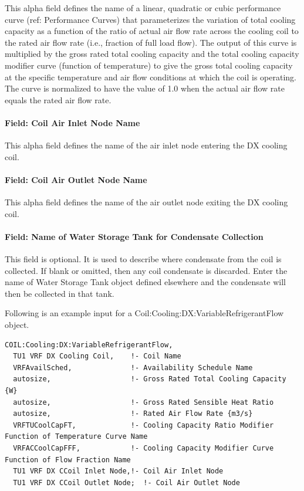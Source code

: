 This alpha field defines the name of a linear, quadratic or cubic performance curve (ref: Performance Curves) that parameterizes the variation of total cooling capacity as a function of the ratio of actual air flow rate across the cooling coil to the rated air flow rate (i.e., fraction of full load flow). The output of this curve is multiplied by the gross rated total cooling capacity and the total cooling capacity modifier curve (function of temperature) to give the gross total cooling capacity at the specific temperature and air flow conditions at which the coil is operating. The curve is normalized to have the value of 1.0 when the actual air flow rate equals the rated air flow rate.

\paragraph{Field: Coil Air Inlet Node Name}\label{field-coil-air-inlet-node-name}

This alpha field defines the name of the air inlet node entering the DX cooling coil.

\paragraph{Field: Coil Air Outlet Node Name}\label{field-coil-air-outlet-node-name}

This alpha field defines the name of the air outlet node exiting the DX cooling coil.

\paragraph{Field: Name of Water Storage Tank for Condensate Collection}\label{field-name-of-water-storage-tank-for-condensate-collection}

This field is optional. It is used to describe where condensate from the coil is collected. If blank or omitted, then any coil condensate is discarded. Enter the name of Water Storage Tank object defined elsewhere and the condensate will then be collected in that tank.

Following is an example input for a Coil:Cooling:DX:VariableRefrigerantFlow object.

\begin{lstlisting}
COIL:Cooling:DX:VariableRefrigerantFlow,
  TU1 VRF DX Cooling Coil,    !- Coil Name
  VRFAvailSched,              !- Availability Schedule Name
  autosize,                   !- Gross Rated Total Cooling Capacity {W}
  autosize,                   !- Gross Rated Sensible Heat Ratio
  autosize,                   !- Rated Air Flow Rate {m3/s}
  VRFTUCoolCapFT,             !- Cooling Capacity Ratio Modifier Function of Temperature Curve Name
  VRFACCoolCapFFF,            !- Cooling Capacity Modifier Curve Function of Flow Fraction Name
  TU1 VRF DX CCoil Inlet Node,!- Coil Air Inlet Node
  TU1 VRF DX CCoil Outlet Node;  !- Coil Air Outlet Node
\end{lstlisting}

